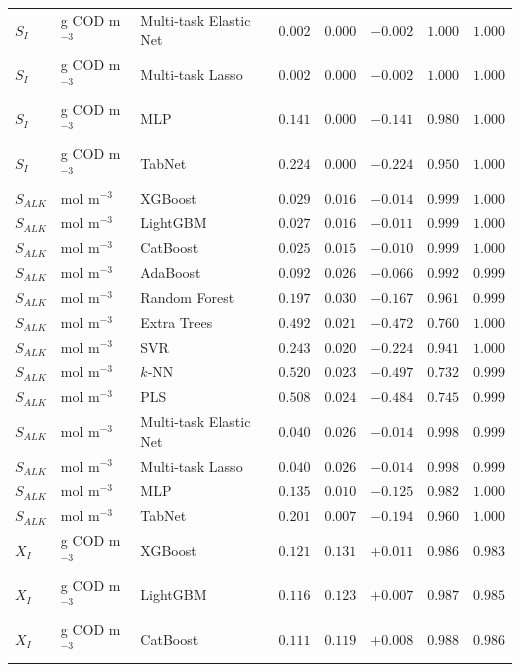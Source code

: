 \begin{longtable}{llp{3.1cm}rrrrr}
$S_{I}$ & g COD m$^{-3}$ & Multi-task Elastic Net & $0.002$ & $0.000$ & $-0.002$ & $1.000$ & $1.000$ \\
$S_{I}$ & g COD m$^{-3}$ & Multi-task Lasso & $0.002$ & $0.000$ & $-0.002$ & $1.000$ & $1.000$ \\
$S_{I}$ & g COD m$^{-3}$ & MLP & $0.141$ & $0.000$ & $-0.141$ & $0.980$ & $1.000$ \\
$S_{I}$ & g COD m$^{-3}$ & TabNet & $0.224$ & $0.000$ & $-0.224$ & $0.950$ & $1.000$ \\
$S_{ALK}$ & mol m$^{-3}$ & XGBoost & $0.029$ & $0.016$ & $-0.014$ & $0.999$ & $1.000$ \\
$S_{ALK}$ & mol m$^{-3}$ & LightGBM & $0.027$ & $0.016$ & $-0.011$ & $0.999$ & $1.000$ \\
$S_{ALK}$ & mol m$^{-3}$ & CatBoost & $0.025$ & $0.015$ & $-0.010$ & $0.999$ & $1.000$ \\
$S_{ALK}$ & mol m$^{-3}$ & AdaBoost & $0.092$ & $0.026$ & $-0.066$ & $0.992$ & $0.999$ \\
$S_{ALK}$ & mol m$^{-3}$ & Random Forest & $0.197$ & $0.030$ & $-0.167$ & $0.961$ & $0.999$ \\
$S_{ALK}$ & mol m$^{-3}$ & Extra Trees & $0.492$ & $0.021$ & $-0.472$ & $0.760$ & $1.000$ \\
$S_{ALK}$ & mol m$^{-3}$ & SVR & $0.243$ & $0.020$ & $-0.224$ & $0.941$ & $1.000$ \\
$S_{ALK}$ & mol m$^{-3}$ & $k$-NN & $0.520$ & $0.023$ & $-0.497$ & $0.732$ & $0.999$ \\
$S_{ALK}$ & mol m$^{-3}$ & PLS & $0.508$ & $0.024$ & $-0.484$ & $0.745$ & $0.999$ \\
$S_{ALK}$ & mol m$^{-3}$ & Multi-task Elastic Net & $0.040$ & $0.026$ & $-0.014$ & $0.998$ & $0.999$ \\
$S_{ALK}$ & mol m$^{-3}$ & Multi-task Lasso & $0.040$ & $0.026$ & $-0.014$ & $0.998$ & $0.999$ \\
$S_{ALK}$ & mol m$^{-3}$ & MLP & $0.135$ & $0.010$ & $-0.125$ & $0.982$ & $1.000$ \\
$S_{ALK}$ & mol m$^{-3}$ & TabNet & $0.201$ & $0.007$ & $-0.194$ & $0.960$ & $1.000$ \\
$X_{I}$ & g COD m$^{-3}$ & XGBoost & $0.121$ & $0.131$ & $+0.011$ & $0.986$ & $0.983$ \\
$X_{I}$ & g COD m$^{-3}$ & LightGBM & $0.116$ & $0.123$ & $+0.007$ & $0.987$ & $0.985$ \\
$X_{I}$ & g COD m$^{-3}$ & CatBoost & $0.111$ & $0.119$ & $+0.008$ & $0.988$ & $0.986$ \\

\end{longtable}
